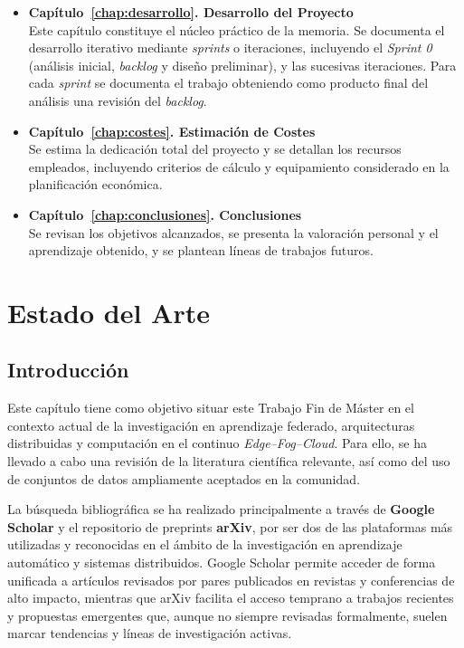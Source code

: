 \documentclass{report}
\begin{document}
\begin{itemize}
    \item \textbf{Capítulo~\ref{chap:desarrollo}. Desarrollo del Proyecto}\\
    Este capítulo constituye el núcleo práctico de la memoria. Se documenta el desarrollo iterativo mediante \textit{sprints} o iteraciones, incluyendo el \textit{Sprint 0} (análisis inicial, \textit{backlog} y diseño preliminar), y las sucesivas iteraciones. Para cada \textit{sprint} se documenta el trabajo obteniendo como producto final del análisis una revisión del \textit{backlog}.

    \item \textbf{Capítulo~\ref{chap:costes}. Estimación de Costes}\\
    Se estima la dedicación total del proyecto y se detallan los recursos empleados, incluyendo criterios de cálculo y equipamiento considerado en la planificación económica.

    \item \textbf{Capítulo~\ref{chap:conclusiones}. Conclusiones}\\
    Se revisan los objetivos alcanzados, se presenta la valoración personal y el aprendizaje obtenido, y se plantean líneas de trabajos futuros.

\end{itemize}


\chapter{Estado del Arte}
\label{chap:estado-del-arte}


\section{Introducción}

Este capítulo tiene como objetivo situar este Trabajo Fin de Máster en el contexto actual de la investigación en aprendizaje federado, arquitecturas distribuidas y computación en el continuo \textit{Edge--Fog--Cloud}. Para ello, se ha llevado a cabo una revisión de la literatura científica relevante, así como del uso de conjuntos de datos ampliamente aceptados en la comunidad.

La búsqueda bibliográfica se ha realizado principalmente a través de \textbf{Google Scholar} y el repositorio de preprints \textbf{arXiv}, por ser dos de las plataformas más utilizadas y reconocidas en el ámbito de la investigación en aprendizaje automático y sistemas distribuidos. Google Scholar permite acceder de forma unificada a artículos revisados por pares publicados en revistas y conferencias de alto impacto, mientras que arXiv facilita el acceso temprano a trabajos recientes y propuestas emergentes que, aunque no siempre revisadas formalmente, suelen marcar tendencias y líneas de investigación activas.
\end{document}
